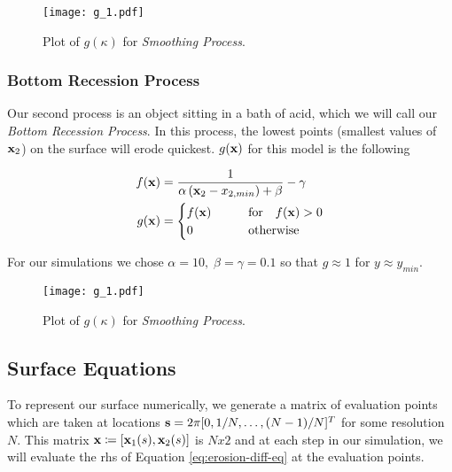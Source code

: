 \begin{figure}[H]
    \begin{center}
      \texttt{[image: g\_1.pdf]}
    \end{center}
  \vspace{-.2in} %
  \caption{\label{fig:g-1} Plot of $g(\kappa)$ for \textit{Smoothing Process}.}
\end{figure}

\subsubsection*{Bottom Recession Process}

Our second process is an object sitting in a bath of acid, which we will call our \textit{Bottom Recession Process}. In this process, the lowest points (smallest values of $\mathbf{x}_2$) on the surface will erode quickest. $g(\mathbf{x})$ for this model is the following

\begin{align}
  f(\mathbf{x})& = \frac{1}{\alpha \, (\mathbf{x}_2 - x_{2, min}) + \beta} - \gamma\\
  g(\mathbf{x})& = \begin{cases}
    f(\mathbf{x}) \qquad &\text{for} \quad f(\mathbf{x}) > 0\\
    0 \qquad &\text{otherwise}
  \end{cases}
\end{align}

For our simulations we chose $\alpha = 10, \; \beta = \gamma = 0.1$ so that $g \approx 1$ for $y \approx y_{min}$.

\begin{figure}[H]
    \begin{center}
      \texttt{[image: g\_1.pdf]}
    \end{center}
  \vspace{-.2in} %
  \caption{\label{fig:g-1} Plot of $g(\kappa)$ for \textit{Smoothing Process}.}
\end{figure}

\subsection*{Surface Equations}

To represent our surface numerically, we generate a matrix of evaluation points which are taken at locations $\mathbf{s} = 2 \pi [0, 1/N, \dotsc, (N-1)/N]^T$ for some resolution $N$. This matrix $\bvec{x} \coloneqq \bracket{\bvec{x}_1(s), \bvec{x}_2(s)}$ is $N x 2$ and at each step in our simulation, we will evaluate the rhs of Equation \ref{eq:erosion-diff-eq} at the evaluation points.

